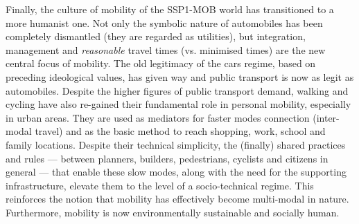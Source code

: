 Finally, the culture of mobility of the SSP1-MOB world has transitioned to a more humanist one. Not only the symbolic nature of automobiles has been completely dismantled (they are regarded as utilities), but integration, management and \emph{reasonable} travel times (vs. minimised times) are the new central focus of mobility. The old legitimacy of the cars regime, based on preceding ideological values, has given way and public transport is now as legit as automobiles. Despite the higher figures of public transport demand, walking and cycling have also re-gained their fundamental role in personal mobility, especially in urban areas. They are used as mediators for faster modes connection (inter-modal travel) and as the basic method to reach shopping, work, school and family locations. Despite their technical simplicity, the (finally) shared practices and rules --- between planners, builders, pedestrians, cyclists and citizens in general --- that enable these slow modes, along with the need for the supporting infrastructure, elevate them to the level of a socio-technical regime. This reinforces the notion that mobility has effectively become multi-modal in nature. Furthermore, mobility is now environmentally sustainable and socially human.

